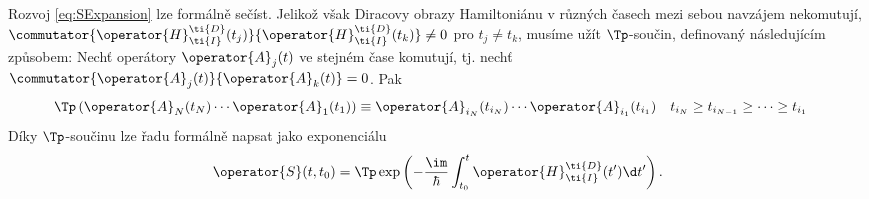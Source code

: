 Rozvoj \eqref{eq:SExpansion} lze formálně sečíst.
Jelikož však Diracovy obrazy Hamiltoniánu v různých časech mezi sebou navzájem nekomutují, $\commutator{\operator{H}^{\ti{D}}_{\ti{I}}(t_{j})}{\operator{H}^{\ti{D}}_{\ti{I}}(t_{k})}\neq0$ pro $t_{j}\neq t_{k}$, musíme užít $\Tp$-součin, definovaný následujícím způsobem:
Nechť operátory $\operator{A}_{j}(t)$ ve stejném čase komutují, tj. nechť $\commutator{\operator{A}_{j}(t)}{\operator{A}_{k}(t)}=0$.
Pak
\begin{align}
    \Tp\left(\operator{A}_{N}(t_{N})\dotsm\operator{A}_{1}(t_{1})\right)
        &\equiv\operator{A}_{i_{N}}(t_{i_{N}})\dotsm\operator{A}_{i_{1}}(t_{i_{1}})
        &&t_{i_{N}}\geq t_{i_{N-1}}\geq\dotsb\geq t_{i_{1}}
\end{align}
Díky $\Tp$-součinu lze řadu formálně napsat jako exponenciálu
\begin{equation}
    \operator{S}(t,t_{0})
        =\Tp\exp\left(-\frac{\im}{\hbar}\int_{t_{0}}^{t}\operator{H}_{\ti{I}}^{\ti{D}}(t')\d t'\right).
\end{equation}
